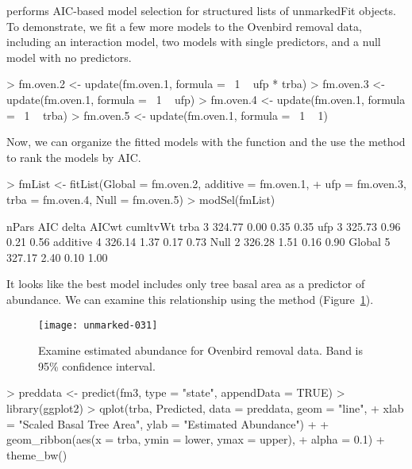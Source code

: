 \documentclass[article,shortnames]{jss}
\begin{document}
 performs AIC-based model selection for structured lists of 
unmarkedFit objects.  To demonstrate, we fit a few more models to the Ovenbird
removal data, including an interaction model, two models with
single predictors, and a null model with no predictors.

\begin{Schunk}
\begin{Sinput}
> fm.oven.2 <- update(fm.oven.1, formula = ~1 ~ ufp * trba)
> fm.oven.3 <- update(fm.oven.1, formula = ~1 ~ ufp)
> fm.oven.4 <- update(fm.oven.1, formula = ~1 ~ trba)
> fm.oven.5 <- update(fm.oven.1, formula = ~1 ~ 1)
\end{Sinput}
\end{Schunk}

Now, we can organize the fitted models with the  function and
the use the  method to rank the models by AIC.

\begin{Schunk}
\begin{Sinput}
> fmList <- fitList(Global = fm.oven.2, additive = fm.oven.1, 
+     ufp = fm.oven.3, trba = fm.oven.4, Null = fm.oven.5)
> modSel(fmList)
\end{Sinput}
\begin{Soutput}
         nPars    AIC delta AICwt cumltvWt
trba         3 324.77  0.00  0.35     0.35
ufp          3 325.73  0.96  0.21     0.56
additive     4 326.14  1.37  0.17     0.73
Null         2 326.28  1.51  0.16     0.90
Global       5 327.17  2.40  0.10     1.00
\end{Soutput}
\end{Schunk}

It looks like the best model includes only tree basal area as a
predictor of abundance.  We can examine this relationship using
the  method (Figure~\ref{fig:pred}).


\begin{figure}[ht]
  \centering
\texttt{[image: unmarked-031]}
\caption{Examine estimated abundance for Ovenbird removal data.  Band
  is 95\% confidence interval.}
\label{fig:pred}
\end{figure}

\begin{Schunk}
\begin{Sinput}
> preddata <- predict(fm3, type = "state", appendData = TRUE)
> library(ggplot2)
> qplot(trba, Predicted, data = preddata, geom = "line", 
+     xlab = "Scaled Basal Tree Area", ylab = "Estimated Abundance") + 
+     geom_ribbon(aes(x = trba, ymin = lower, ymax = upper), 
+         alpha = 0.1) + theme_bw()
\end{Sinput}
\end{Schunk}
\end{document}
